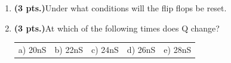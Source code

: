 \documentclass{article}
\begin{document}
\begin{enumerate}
\item {\bf (3 pts.)}Under what conditions will the flip flops be reset.

\item {\bf (3 pts.)}At which of the following times does Q change?

\begin{tabular}{p{0.75in}p{0.75in}p{0.75in}p{0.75in}p{0.75in}}
a) 20nS  & b) 22nS  & c) 24nS & d) 26nS & e) 28nS \\
\end{tabular}

\pagebreak


\end{enumerate}
\end{document}

